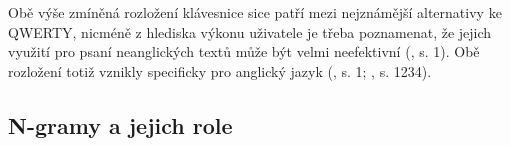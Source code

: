 \documentclass[a4paper, twoside, 12pt, czech]{article}
\begin{document}
Obě výše zmíněná rozložení klávesnice sice patří mezi nejznámější alternativy 
ke QWERTY, nicméně z hlediska výkonu uživatele je třeba poznamenat, že jejich využití 
pro psaní neanglických textů může být velmi neefektivní (\cite{applicationAlgo}, s. 1).
Obě rozložení totiž vznikly specificky pro anglický jazyk (\cite{applicationAlgo}, s. 1; \cite{qwerty-dilemma}, s. 1234).

\subsection{N-gramy a jejich role}



\end{document}
